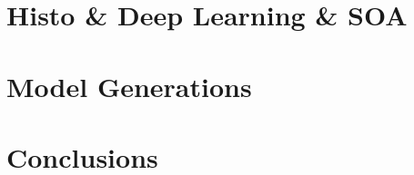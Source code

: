 \documentclass[12pt,a4paper]{report}
\begin{document}




\tableofcontents{}



\chapter{Histo \& Deep Learning \& SOA}
    
    
    

\chapter{Model Generations}

\chapter{Conclusions}
    


\end{document}
